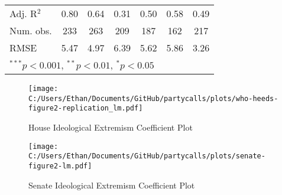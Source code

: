 \documentclass[12pt]{article}
\begin{document}
\begin{table}
\begin{center}
\begin{tabular}{l c c c c c c }
			Adj. R$^2$             & 0.80          & 0.64          & 0.31         & 0.50         & 0.58          & 0.49          \\
			Num. obs.              & 233           & 263           & 209          & 187          & 162           & 217           \\
			RMSE                   & 5.47          & 4.97          & 6.39         & 5.62         & 5.86          & 3.26          \\
			\hline
			\multicolumn{7}{l}{\scriptsize{$^{***}p<0.001$, $^{**}p<0.01$, $^*p<0.05$}}
		\end{tabular}
	\end{center}
\end{table}

\begin{figure}[H]
	\centering
	\caption{House Ideological Extremism Coefficient Plot}
	\texttt{[image: C:/Users/Ethan/Documents/GitHub/partycalls/plots/who-heeds-figure2-replication\_lm.pdf]}
\end{figure}

\begin{figure}[H]
	\centering
	\caption{Senate Ideological Extremism Coefficient Plot}
	\texttt{[image: C:/Users/Ethan/Documents/GitHub/partycalls/plots/senate-figure2-lm.pdf]}
\end{figure}
\end{document}
